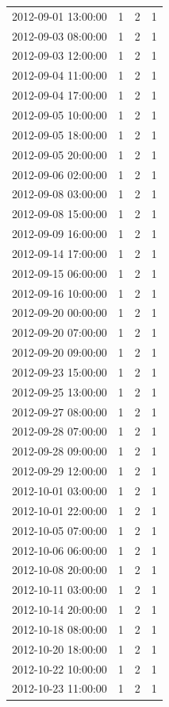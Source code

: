 \begin{tabular}{lrrr}
2012-09-01 13:00:00 & 1 & 2 & 1 \\
2012-09-03 08:00:00 & 1 & 2 & 1 \\
2012-09-03 12:00:00 & 1 & 2 & 1 \\
2012-09-04 11:00:00 & 1 & 2 & 1 \\
2012-09-04 17:00:00 & 1 & 2 & 1 \\
2012-09-05 10:00:00 & 1 & 2 & 1 \\
2012-09-05 18:00:00 & 1 & 2 & 1 \\
2012-09-05 20:00:00 & 1 & 2 & 1 \\
2012-09-06 02:00:00 & 1 & 2 & 1 \\
2012-09-08 03:00:00 & 1 & 2 & 1 \\
2012-09-08 15:00:00 & 1 & 2 & 1 \\
2012-09-09 16:00:00 & 1 & 2 & 1 \\
2012-09-14 17:00:00 & 1 & 2 & 1 \\
2012-09-15 06:00:00 & 1 & 2 & 1 \\
2012-09-16 10:00:00 & 1 & 2 & 1 \\
2012-09-20 00:00:00 & 1 & 2 & 1 \\
2012-09-20 07:00:00 & 1 & 2 & 1 \\
2012-09-20 09:00:00 & 1 & 2 & 1 \\
2012-09-23 15:00:00 & 1 & 2 & 1 \\
2012-09-25 13:00:00 & 1 & 2 & 1 \\
2012-09-27 08:00:00 & 1 & 2 & 1 \\
2012-09-28 07:00:00 & 1 & 2 & 1 \\
2012-09-28 09:00:00 & 1 & 2 & 1 \\
2012-09-29 12:00:00 & 1 & 2 & 1 \\
2012-10-01 03:00:00 & 1 & 2 & 1 \\
2012-10-01 22:00:00 & 1 & 2 & 1 \\
2012-10-05 07:00:00 & 1 & 2 & 1 \\
2012-10-06 06:00:00 & 1 & 2 & 1 \\
2012-10-08 20:00:00 & 1 & 2 & 1 \\
2012-10-11 03:00:00 & 1 & 2 & 1 \\
2012-10-14 20:00:00 & 1 & 2 & 1 \\
2012-10-18 08:00:00 & 1 & 2 & 1 \\
2012-10-20 18:00:00 & 1 & 2 & 1 \\
2012-10-22 10:00:00 & 1 & 2 & 1 \\
2012-10-23 11:00:00 & 1 & 2 & 1 \\

\end{tabular}
